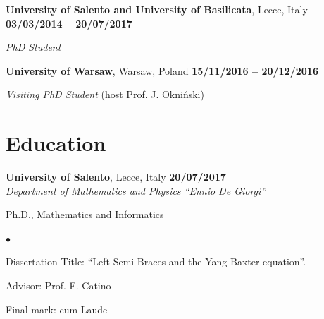 \documentclass[margin,line]{res}
\newenvironment{list1}{
  \begin{list}{\ding{113}}{%
      \setlength{\itemsep}{0in}
      \setlength{\parsep}{0in} \setlength{\parskip}{0in}
      \setlength{\topsep}{0in} \setlength{\partopsep}{0in} 
      \setlength{\leftmargin}{0.17in}}}{\end{list}}
\newenvironment{list2}{
  \begin{list}{$\bullet$}{%
      \setlength{\itemsep}{-0in}
      \setlength{\parsep}{0in} \setlength{\parskip}{0in}
      \setlength{\topsep}{0in} \setlength{\partopsep}{0in} 
      \setlength{\leftmargin}{0.2in}}}{\end{list}}
\begin{document}
\begin{resume}
\vspace{-0.1in}
{\bf University of Salento and University of Basilicata}, Lecce, Italy \hfill{\bf 03/03/2014 -- 20/07/2017}


\vspace{-.3cm}
{\em PhD Student}

\vspace{-0.1in}
{\bf University of Warsaw}, Warsaw, Poland \hfill{\bf 15/11/2016 -- 20/12/2016}

\vspace{-.3cm}
{\em Visiting PhD Student} (host Prof. J. Okniński)
	
\vspace{8pt}
\section{\sc Education}
{\bf University of Salento}, Lecce, Italy \hfill {\bf  20/07/2017}\\
{\em Department of Mathematics and Physics ``Ennio De Giorgi''} 
\begin{list1}
\item[] Ph.D., Mathematics and Informatics
\begin{list2}
\vspace*{.05in}
\item[] Dissertation Title: ``Left Semi-Braces and the Yang-Baxter equation''. 
\item[] Advisor: Prof. F. Catino
\item[] Final mark: cum Laude
\end{list2}
\end{list1}


\end{resume}
\end{document}
